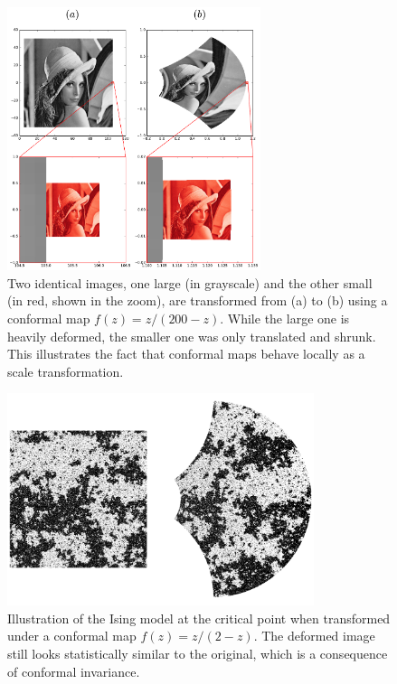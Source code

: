 \begin{figure}
\begin{center}
    \includegraphics[width=0.66\textwidth]{chapters/ch3-conf/figs/lenna}
\end{center}
\caption{Two identical images, one large (in grayscale) and the other small (in
    red, shown in the zoom), are transformed from (a) to (b) using a conformal
    map $f(z)=z/(200-z)$. While the large one is heavily deformed, the smaller
    one was only translated and shrunk. This illustrates the fact that conformal
    maps behave locally as a scale transformation.}
\label{fig:lenna}
\end{figure}

\begin{figure}
\begin{center}
    \includegraphics[width=0.8\textwidth]{chapters/ch3-conf/figs/isingcm}
\end{center}
\caption{Illustration of the Ising model at the critical point when transformed
    under a conformal map $f(z)=z/(2-z)$. The deformed image still looks
    statistically similar to the original, which is a consequence of conformal
    invariance.}
\label{fig:isingcm}
\end{figure}

